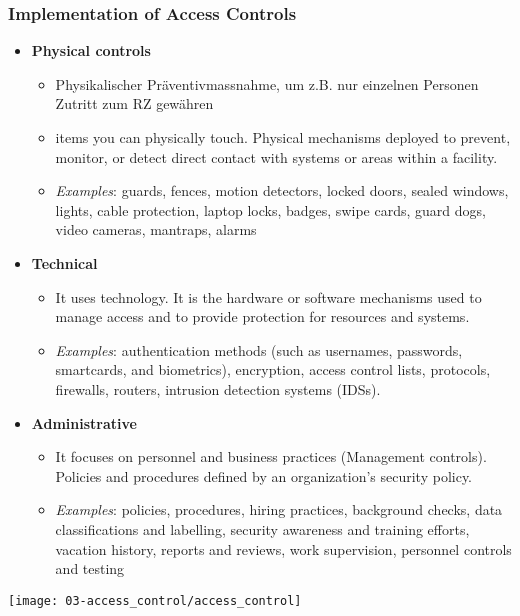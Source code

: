 \subsubsection{Implementation of Access Controls}
\begin{itemize}
    \item \textbf{Physical controls}
    \begin{itemize}
        \item Physikalischer Präventivmassnahme, um z.B. nur einzelnen Personen Zutritt zum RZ gewähren
        \item items you can physically touch. Physical mechanisms deployed to prevent, monitor, or detect direct contact with systems or areas within a facility.
        \item \textit{Examples}: guards, fences, motion detectors, locked doors, sealed windows, lights, cable protection, laptop locks, badges, swipe cards, guard dogs, video cameras, mantraps, alarms
    \end{itemize}
    \item \textbf{Technical}
    \begin{itemize}
        \item It uses technology. It is the hardware or software mechanisms used to manage access and to provide protection for resources and systems.
        \item \textit{Examples}: authentication methods (such as usernames, passwords, smartcards, and biometrics), encryption, access control lists, protocols, firewalls, routers, intrusion detection systems (IDSs).
    \end{itemize}
    \item \textbf{Administrative}
    \begin{itemize}
        \item It focuses on personnel and business practices (Management controls). Policies and procedures defined by an organization's security policy.
        \item \textit{Examples}: policies, procedures, hiring practices, background checks, data classifications and labelling, security awareness and training efforts, vacation history, reports and reviews, work supervision, personnel controls and testing
    \end{itemize}
\end{itemize}

\begin{center}
    \texttt{[image: 03-access\_control/access\_control]}
    \vspace{-8pt}
\end{center}

